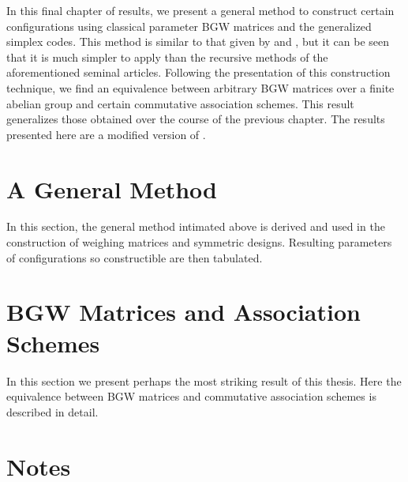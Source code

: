 \documentclass[../../main]{subfiles}
\begin{document}
In this final chapter of results, we present a general method
\cite[see][]{w-mat-construct} to construct certain configurations using
classical parameter BGW matrices and the generalized simplex codes. This method
is similar to that given by \cite{rajkundlia} and \cite{ionin-bgw-bibd}, but it
can be seen that it is much simpler to apply than the recursive methods of the
aforementioned seminal articles. Following the presentation of this construction
technique, we find an equivalence between arbitrary BGW matrices over a finite
abelian group and certain commutative association schemes. This result
generalizes those obtained over the course of the previous chapter. The results
presented here are a modified version of \cite{w-mat-construct}.

\fancyhf{}

\fancyhead[RO,LE]{\thepage}

 \section{\centering A General Method}
 
 In this section, the general method intimated above is derived and used in the
 construction of weighing matrices and symmetric designs. Resulting parameters
 of configurations so constructible are then tabulated. 
 
 \dinkus
 
 
 
 \fancyhf{}

 \fancyhead[RO,LE]{\thepage}

 \section{\centering BGW Matrices and Association Schemes}
 
 In this section we present perhaps the most striking result of this thesis. Here
 the equivalence between BGW matrices and commutative association schemes is
 described in detail. 
 
 \dinkus
 
 
 
 \singlespace
 
 \fancyhf{}

 \fancyhead[RO,LE]{\thepage}

 \section*{\centering Notes}
 \thefnotes
 
 \doublespacing
 
 \biblio
\end{document}
